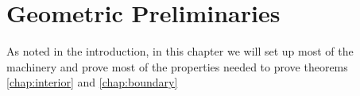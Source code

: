 \chapter{Geometric Preliminaries}\label{chap:preliminaries}
As noted in the introduction, in this chapter we will set up most of the machinery and prove most of the properties needed to prove theorems \ref{chap:interior} and \ref{chap:boundary} 




